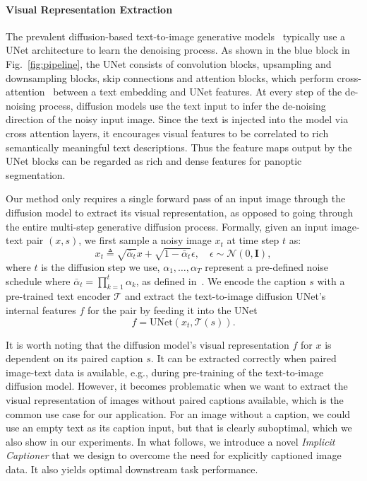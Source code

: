 \documentclass[10pt,twocolumn,letterpaper]{article}
\begin{document}
\paragraph{Visual Representation Extraction}
The prevalent diffusion-based text-to-image generative models~\cite{ramesh2022dalle2,saharia2022imagen,rombach2022ldm, nichol2021glide} typically use a UNet architecture to learn the denoising process. As shown in the blue block in Fig.~\ref{fig:pipeline}, the UNet consists of convolution blocks, upsampling and downsampling blocks, skip connections and attention blocks, which perform cross-attention~\cite{vaswani2017attention} between a text embedding and UNet features.
At every step of the de-noising process, diffusion models use the text input to infer the de-noising direction of the noisy input image. 
Since the text is injected into the model via cross attention layers, it encourages visual features to be correlated to rich semantically meaningful text descriptions. 
Thus the feature maps output by the UNet blocks can be regarded as rich and dense features for panoptic segmentation. 

Our method only requires a single forward pass of an input image through the diffusion model to extract its visual representation, as opposed to going through the entire multi-step generative diffusion process.  
Formally, given an input image-text pair $(x, s)$, 
we first sample a noisy image $x_t$ at time step $t$ as:
\begin{equation}
\label{eqn:noise}
x_t \triangleq \sqrt{\bar{\alpha}_{t}} x+\sqrt{1-\bar{\alpha}_{t}} \epsilon, \quad \epsilon \sim \mathcal{N}(0,\mathbf{I}),
\end{equation}
where $t$ is the diffusion step we use, $\alpha_1,\dots,\alpha_T$ represent a pre-defined noise schedule where $\bar{\alpha}_{t}{=}\prod_{k=1}^t\alpha_k$, as defined in~\cite{ho2020denoising}.
We encode the caption $s$ with a pre-trained text encoder $\mathcal{T}$ and extract the text-to-image diffusion UNet's internal features $f$ for the pair by feeding it into the UNet
\begin{equation}
   f =  \text{UNet}(x_t, \mathcal{T}(s)).
\end{equation}

It is worth noting that the diffusion model's visual representation $f$ for $x$ is dependent on its paired caption $s$. 
It can be extracted correctly when paired image-text data is available, e.g., during pre-training of the text-to-image diffusion model. 
However, it becomes problematic when we want to extract the visual representation of images without paired captions available, which is the common use case for our application. 
For an image without a caption, we could use an empty text as its caption input, but that is clearly suboptimal, which we also show in our experiments. 
In what follows, we introduce a novel \emph{Implicit Captioner} that we design to overcome the need for explicitly captioned image data. It also yields optimal downstream task performance.
\end{document}
